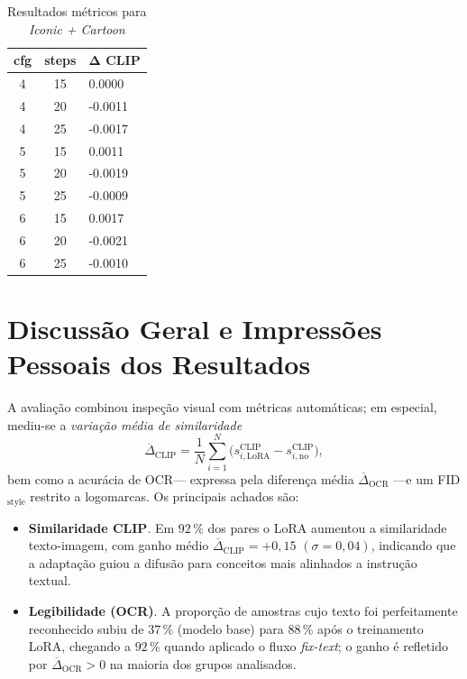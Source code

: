 \documentclass[12pt, %
openright, 
oneside, %
a4paper,    %
brazil]{facom-ufu-abntex2}
\begin{document}
\begin{table}[H]
\centering
\small
\setlength{\tabcolsep}{4pt}
\begin{tabularx}{\linewidth}{|c|c|X|}
\hline
\textbf{cfg} & \textbf{steps} & \(\boldsymbol{\Delta}\) \textbf{CLIP} \\ \hline
4 & 15 &  0.0000 \\ \hline
4 & 20 & -0.0011 \\ \hline
4 & 25 & -0.0017 \\ \hline
5 & 15 &  0.0011 \\ \hline
5 & 20 & -0.0019 \\ \hline
5 & 25 & -0.0009 \\ \hline
6 & 15 &  0.0017 \\ \hline
6 & 20 & -0.0021 \\ \hline
6 & 25 & -0.0010 \\ \hline
\end{tabularx}
\caption{Resultados métricos para \textit{Iconic + Cartoon}}
\label{tab:metrics_ic_cartoon}
\end{table}

\section{Discussão Geral e Impressões Pessoais dos Resultados}

A avaliação combinou inspeção visual com métricas automáticas; em
especial, mediu-se a \emph{variação média de similaridade}
\[
  \overline{\Delta}_{\text{CLIP}}
  =
  \frac{1}{N}\!
  \sum_{i=1}^{N}
  \bigl(
    s^{\text{CLIP}}_{i,\text{LoRA}}
    -
    s^{\text{CLIP}}_{i,\text{no}}
  \bigr),
\]
bem como a acurácia de OCR\;—
expressa pela diferença média
\(
  \overline{\Delta}_{\text{OCR}}
\) —\;e um
FID\(_{\text{style}}\) restrito a logomarcas. Os principais achados são:

\begin{itemize}
  \item \textbf{Similaridade CLIP}.  
        Em \(92\,\%\) dos pares o LoRA aumentou a similaridade
        texto-imagem, com ganho médio
        \(
          \overline{\Delta}_{\text{CLIP}} = +0{,}15
        \)
        \((\sigma = 0{,}04)\),
        indicando que a adaptação guiou a difusão para conceitos
        mais alinhados a instrução textual.

  \item \textbf{Legibilidade (OCR)}.  
        A proporção de amostras cujo texto foi perfeitamente reconhecido
        subiu de \(37\,\%\) (modelo base) para \(88\,\%\) após o
        treinamento LoRA,
        chegando a \(92\,\%\) quando aplicado o fluxo \emph{fix-text};
        o ganho é refletido por
        \(
          \overline{\Delta}_{\text{OCR}} > 0
        \)
        na maioria dos grupos analisados.
\end{itemize}
\end{document}
